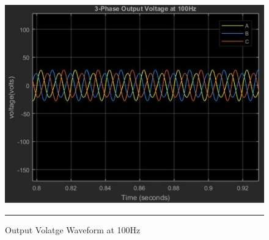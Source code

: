 \begin{figure}[htbp]
	\centering
	\includegraphics[width = 6in]{./Figures/100freq.JPG}
	\rule{35em}{1pt}
	\caption{Output Volatge Waveform at 100Hz}
\end{figure}
